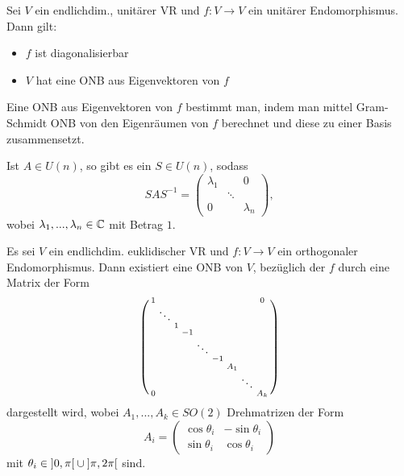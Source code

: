 \documentclass{cheat-sheet}
\begin{document}
\begin{satz}
  Sei $V$ ein endlichdim., unitärer VR und $f : V \to V$ ein unitärer Endomorphismus. Dann gilt:
  \begin{itemize}
    \item $f$ ist diagonalisierbar
    \item $V$ hat eine ONB aus Eigenvektoren von $f$
  \end{itemize}
\end{satz}

\begin{verf}
  Eine ONB aus Eigenvektoren von $f$ bestimmt man, indem man mittel Gram-Schmidt ONB von den Eigenräumen von $f$ berechnet und diese zu einer Basis zusammensetzt.
\end{verf}

\begin{kor}
  Ist $A \in U(n)$, so gibt es ein $S \in U(n)$, sodass
  \[ SAS^{-1} = \begin{pmatrix} \lambda_1 & & 0 \\ & \ddots & \\ 0 & & \lambda_n \end{pmatrix}, \]
  wobei $\lambda_1, ..., \lambda_n \in \mathbb{C}$ mit Betrag $1$.
\end{kor}

\begin{satz}
  Es sei $V$ ein endlichdim. euklidischer VR und $f : V \to V$ ein orthogonaler Endomorphismus. Dann existiert eine ONB von $V$, bezüglich der $f$ durch eine Matrix der Form
  \[ \begin{psmallmatrix}
  1 & & & & & & & & 0 \\
  & \ddots && \\
  && 1 \\
  &&& -1 \\
  &&&& \ddots \\
  &&&&& -1 \\
  &&&&&& A_1 \\
  &&&&&&& \ddots \\
  0 &&&&&&&& A_k  \\
  \end{psmallmatrix} \]
  dargestellt wird, wobei $A_1, ..., A_k \in SO(2)$ Drehmatrizen der Form
  \[ A_i = \begin{pmatrix}
  \cos \theta_i & - \sin \theta_i \\
  \sin \theta_i & \cos \theta_i
  \end{pmatrix} \]
  mit $\theta_i \in \left] 0, \pi \right[ \cup \left] \pi, 2 \pi \right[$ sind.
\end{satz}
\end{document}
